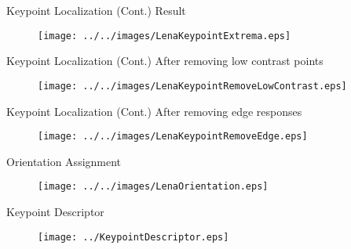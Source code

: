 \documentclass[
  size=12pt,
  paper=screen,
  mode=present,
  style=sailor
]{powerdot}
\begin{document}
\begin{slide}{Keypoint Localization (Cont.)}
  Result
  \begin{figure}
    \begin{center}
      \texttt{[image: ../../images/LenaKeypointExtrema.eps]}\\
    \end{center}\label{Fi:EXT}
  \end{figure}
\end{slide}

\begin{slide}{Keypoint Localization (Cont.)}
  After removing low contrast points
  \begin{figure}
    \begin{center}
      \texttt{[image: ../../images/LenaKeypointRemoveLowContrast.eps]}\\
    \end{center}\label{Fi:EXT}
  \end{figure}
\end{slide}

\begin{slide}{Keypoint Localization (Cont.)}
  After removing edge responses
  \begin{figure}
    \begin{center}
      \texttt{[image: ../../images/LenaKeypointRemoveEdge.eps]}\\
    \end{center}\label{Fi:EXT}
  \end{figure}
\end{slide}

\begin{slide}{Orientation Assignment}
  \begin{figure}
    \begin{center}
      \texttt{[image: ../../images/LenaOrientation.eps]}\\
    \end{center}\label{Fi:EXT}
  \end{figure}
\end{slide}

\begin{slide}{Keypoint Descriptor}
  \begin{figure}
    \begin{center}
      \texttt{[image: ../KeypointDescriptor.eps]}\\
    \end{center}\label{Fi:EXT}
  \end{figure}
\end{slide}
\end{document}
